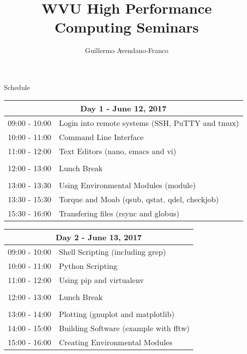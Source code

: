 \documentclass[letterpaper,oneside]{scrbook}
\title{WVU High Performance Computing Seminars}
\author{Guillermo Avendano-Franco}
\begin{document}

\newpage
\begin{center}
\LARGE Schedule
\end{center}

\begin{tabularx}{0.95\textwidth}{|l|X|}
  \hline
  \multicolumn{2}{|c|}{Day 1 - June 12, 2017} \\
  \hline
09:00 - 10:00 & Login into remote systems (SSH, PuTTY and tmux)\\
10:00 - 11:00 & Command Line Interface\\
11:00 - 12:00 & Text Editors (nano, emacs and vi)\\
&\\
12:00 - 13:00 & Lunch Break\\
&\\
13:00 - 13:30 & Using Environmental Modules (module)\\
13:30 - 15:30 & Torque and Moab (qsub, qstat, qdel, checkjob)\\
15:30 - 16:00 & Transfering files (rsync and globus)\\
\hline
\end{tabularx}

\bigskip

\begin{tabularx}{0.95\textwidth}{|l|X|}
  \hline
  \multicolumn{2}{|c|}{Day 2 - June 13, 2017} \\
  \hline
09:00 - 10:00 & Shell Scripting (including grep)\\
10:00 - 11:00 & Python Scripting\\
11:00 - 12:00 & Using pip and virtualenv\\
&\\
12:00 - 13:00 & Lunch Break\\
&\\
13:00 - 14:00 & Plotting (gnuplot and matplotlib)\\
14:00 - 15:00 & Building Software (example with fftw)\\
15:00 - 16:00 & Creating Environmental Modules\\
\hline
\end{tabularx}

\bigskip
\end{document}
